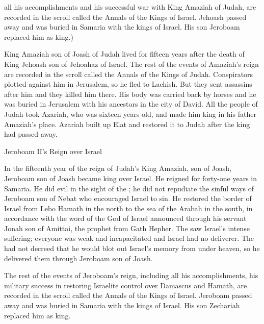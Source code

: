 {all his accomplishments
and his successful war
with
King
Amaziah
of Judah,
are
recorded
in the scroll
called the Annals
of the Kings
of Israel.
Jehoash
passed away
and was buried
in Samaria
with
the kings
of Israel.
His son
Jeroboam
replaced
him as king.)
\par }{\PP {}King
Amaziah
son
of Joash
of Judah
lived
for fifteen
years
after
the death
of King
Jehoash
son
of Jehoahaz
of Israel.
The rest
of the events
of Amaziah’s
reign are
recorded
in the scroll
called the Annals
of the Kings
of Judah.
Conspirators
plotted against
him in
Jerusalem,
so he fled
to Lachish.
But they sent
assassins after
him
and they killed
him there.
His body was carried
back by horses
and he was buried
in Jerusalem
with
his ancestors
in the city
of David.
All
the people
of Judah
took
Azariah,
who was
sixteen
years
old, and made him king
in his father
Amaziah’s
place.
Azariah built up
Elat
and restored
it to Judah
after
the king
had passed away.
\par }{\SH Jeroboam II’s Reign over Israel
\par }{\PP {}In the fifteenth
year
of the reign
of Judah’s
King
Amaziah,
son
of Joash,
Jeroboam
son
of Joash
became king
over Israel.
He reigned for forty-one
years
in Samaria.
He did
evil
in the sight
of the
{}; he did not
repudiate
the sinful
ways of Jeroboam
son
of Nebat
who encouraged
Israel to sin.
He
restored
the
border
of Israel
from Lebo Hamath
in the north to
the sea
of the Arabah
in the south, in accordance with the word
of the {}
God
of Israel
announced
through
his servant
Jonah
son
of Amittai,
the prophet
from
Gath Hepher.
The
{}
saw
Israel’s
intense
suffering;
everyone
was weak and incapacitated
and Israel
had
no
deliverer.
The
{}
had not
decreed
that he would blot out
Israel’s
memory
from under
heaven,
so he delivered
them through
Jeroboam
son
of Joash.
\par }{\PP {}The rest
of the events
of Jeroboam’s
reign, including all
his accomplishments,
his military success
in restoring
Israelite
control over Damascus
and Hamath,
are
recorded
in the scroll
called the Annals
of the Kings
of Israel.
Jeroboam
passed away
and was buried
in Samaria with
the kings
of Israel.
His son
Zechariah
replaced him as king.

}
